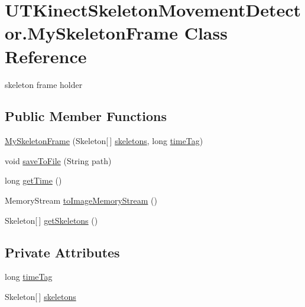 \hypertarget{classUTKinectSkeletonMovementDetector_1_1MySkeletonFrame}{\section{U\-T\-Kinect\-Skeleton\-Movement\-Detector.\-My\-Skeleton\-Frame Class Reference}
\label{classUTKinectSkeletonMovementDetector_1_1MySkeletonFrame}
}


skeleton frame holder  


\subsection*{Public Member Functions}
\begin{DoxyCompactItemize}
\item 
\hyperlink{classUTKinectSkeletonMovementDetector_1_1MySkeletonFrame_a68103ea84830eb794d0ad718f9b6991a}{My\-Skeleton\-Frame} (Skeleton\mbox{[}$\,$\mbox{]} \hyperlink{classUTKinectSkeletonMovementDetector_1_1MySkeletonFrame_a0339c81d632197149363013284a46916}{skeletons}, long \hyperlink{classUTKinectSkeletonMovementDetector_1_1MySkeletonFrame_ab9d7e0d011a54cc036728ac94a2883b7}{time\-Tag})
\item 
void \hyperlink{classUTKinectSkeletonMovementDetector_1_1MySkeletonFrame_af3f9fc03eb13215e4305c572039aeb72}{save\-To\-File} (String path)
\item 
long \hyperlink{classUTKinectSkeletonMovementDetector_1_1MySkeletonFrame_a755f7df242e36e4e458b808d617cda4c}{get\-Time} ()
\item 
Memory\-Stream \hyperlink{classUTKinectSkeletonMovementDetector_1_1MySkeletonFrame_a61c75f59bce07a4925d21c55d4a12e01}{to\-Image\-Memory\-Stream} ()
\item 
Skeleton\mbox{[}$\,$\mbox{]} \hyperlink{classUTKinectSkeletonMovementDetector_1_1MySkeletonFrame_af88bf9afbf8f597fb6ed0087c100918d}{get\-Skeletons} ()
\end{DoxyCompactItemize}
\subsection*{Private Attributes}
\begin{DoxyCompactItemize}
\item 
long \hyperlink{classUTKinectSkeletonMovementDetector_1_1MySkeletonFrame_ab9d7e0d011a54cc036728ac94a2883b7}{time\-Tag}
\item 
Skeleton\mbox{[}$\,$\mbox{]} \hyperlink{classUTKinectSkeletonMovementDetector_1_1MySkeletonFrame_a0339c81d632197149363013284a46916}{skeletons}
\end{DoxyCompactItemize}


